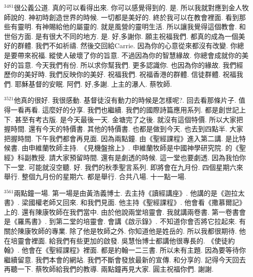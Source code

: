 \documentclass{book}
\begin{document}
$^{3481}$很公義公道.
真的可以看得出來.
你可以感覺得到的.
是.
所以我就對應到金人牧師說的.
神初時創造世界的時候.
一切都是美好的.
終於我可以在教會裡面.
看到那些有靈明.
有神賜給他的屬靈的.
就是風營的靈明生活.
所以讓我覺得這個教會.
和世俗方面.
是有很大不同的地方.
是.
好,多謝你.
願主祝福我們.
都真的成為一個美好的群體.
我們不如祈禱.
然後交回給Carrie.
因為你的心意從來都沒有改變.
你總是要帶來祝福.
縱使人破壞了你的旨意.
不過因為你的智慧緣故.
你總會成就你的美好的旨意.
今天我們有份.
所以求你幫我們.
更多認識你.
也因為你的緣故.
我們經歷你的美好時.
我們反映你的美好.
祝福我們.
祝福香港的群體.
信徒群體.
祝福我們.
耶穌基督的安眠.
阿們.
好,多謝.
上主的瀑人.
蔡牧師.

$^{3521}$他真的很好.
我很感動.
基督徒沒有動力的時候是怎樣呢?.
回去看那條片子.
值得一看再看.
這麼好的分享.
我們也繼續.
我們的國際詩篇應用系列.
都是創世記上下.
甚至有考古版.
是今天最後一天.
金塘完了之後.
就沒有這個特價.
所以大家把握時間.
還有今天的特價書.
其他的特價書.
也都是做到今天.
也去到四點半.
大家把握時間.
下午我們都會再見面.
因為兩點鐘.
由《聖經課程》進入第二講.
是比特候書.
由申維蘭牧師主持.
《見機盤捨上》.
申維蘭牧師是中國神學研究院.
的《聖經》科副教授.
請大家預留時間.
還有是劇透的時候.
這一堂也要劇透.
因為我怕你下一堂.
可能就沒空聽.
好.
我們的秋季聖言系列.
即將會在九月份.
四個星期六來舉行.
整個九月份的星期六.
都是舉行.
合共八場.
十一點一場.

$^{3561}$兩點鐘一場.
第一場是由黃浩義博士.
去主持《讀經講座》.
他講的是《迦拉太書》.
梁國權老師又回來.
和我們見面.
他主持《聖經課程》.
他會看《撒慕爾記》上的.
還有陳康牧師在我們當中.
由於他說兩堂培靈會.
我就講兩卷書.
第一卷書會是《羅馬書》.
到第二堂的培靈會.
會講《啟示錄》.
不知道你會否將它拉起來.
有關於陳康牧師的專業.
除了他是牧師之外.
你知道他是姓岳的.
所以我都很期待.
他在培靈會裡面.
給我們有些更加的啟發.
吳慧怡博士都講他很專長的.
《使徒約翰》.
他會在《聖經課程》裡面.
都是約翰一二三書.
所以未有主題.
因為要等待你繼續留意.
我們本會的網站.
我們不斷會發放最新的宣傳.
和分享的.
記得今天回去再聽一下.
蔡牧師給我們的教導.
兩點鐘再見大家.
圓主祝福你們.
謝謝.
\newpage
\end{document}

